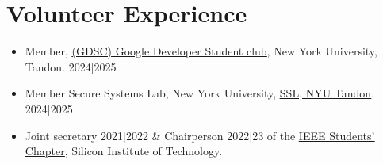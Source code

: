 \documentclass[letterpaper,10pt]{article}
\newcommand{\resumeItem}[1]{
  \item\small{
    {#1 \vspace{-2pt}}
  }
}
\newcommand{\resumeSubItem}[1]{\resumeItem{#1}\vspace{-4pt}}
\newcommand{\resumeSubHeadingListStart}{\begin{itemize}[leftmargin=0.15in, label={}]}
\newcommand{\resumeSubHeadingListEnd}{\end{itemize}}
\begin{document}
\section{Volunteer Experience}
  \resumeSubHeadingListStart
  \resumeSubItem
      {Member, \href{https://www.linkedin.com/company/gdsc-nyu-tandon/}{\underline{(GDSC) Google Developer Student club}}, New York University, Tandon.  2024|2025}
    \resumeSubItem
      {Member Secure Systems Lab, New York University, \href{https://ssl.engineering.nyu.edu/}{\underline{SSL, NYU Tandon}}. 2024|2025}
    \resumeSubItem
      {Joint secretary 2021|2022 \& Chairperson 2022|23 of the \href{https://www.instagram.com/ieeesitbbsr/}{\underline{IEEE Students’ Chapter}}, Silicon Institute of Technology. }
  \resumeSubHeadingListEnd
\end{document}
